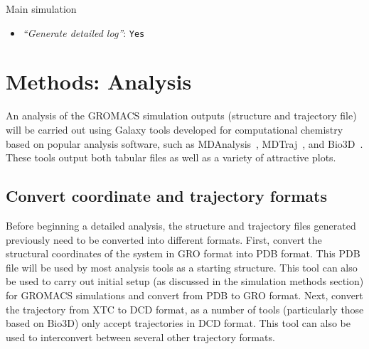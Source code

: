 \documentclass[twocolumn]{bmcart}%
\providecommand{\tightlist}{%
  \setlength{\itemsep}{0pt}\setlength{\parskip}{0pt}}
\begin{document}
\begin{handson_box_colour}{Main simulation}
\begin{itemize}
\begin{itemize}
      \begin{itemize}
      \tightlist
      \item
        \emph{``Temperature /K''}: \texttt{300}
      \item
        \emph{``Step length in ps''}: \texttt{0.001}
      \item
        \emph{``Number of steps that elapse between saving data points
        (velocities, forces, energies)''}: \texttt{1000}
      \item
        \emph{``Number of steps for the simulation''}: \texttt{1000000}
      \end{itemize}
    \end{itemize}
  \item
    \emph{``Generate detailed log''}: \texttt{Yes}
  \end{itemize}

\end{handson_box_colour}


\hypertarget{analysis}{%
\section*{Methods: Analysis}\label{analysis}}

An analysis of the GROMACS simulation outputs (structure and trajectory file) will be carried out using Galaxy tools developed for computational chemistry~\cite{senapathi_biomolecular_2019} based on popular analysis software, such as MDAnalysis~\cite{michaudagrawal_mdanalysis_2011}, MDTraj~\cite{mcgibbon_mdtraj_2015}, and  Bio3D~\cite{skjaerven_integrating_2014}. These tools output both tabular files as well as a variety of attractive plots.



\hypertarget{create-pdb-file-needed-by-most-analysis-tools}{%
\subsection*{Convert coordinate and trajectory formats}\label{create-pdb-file-needed-by-most-analysis-tools}}

Before beginning a detailed analysis, the structure and trajectory files generated previously need to be converted into different formats. First, convert the structural coordinates of the system in GRO format into PDB format. This PDB file will be used by most analysis tools as a starting structure. This tool can also be used to carry out initial setup (as discussed in the simulation methods section) for GROMACS simulations and convert from PDB to GRO format. Next, convert the trajectory from XTC to DCD format, as a number of tools (particularly those based on Bio3D) only accept trajectories in DCD format. This tool can also be used to interconvert between several other trajectory formats.
\end{document}
